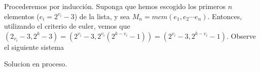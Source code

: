 \begin{sol}
	Procederemos por inducci\'on. Suponga que hemos escogido los primeros $n$ elementos ($e_{i} = 2 ^{v_{i}} - 3$) de la lista, y sea $M_{n} = mcm(e_{1}, e_{2} \cdots e_{n})$. Entonces, utilizando el criterio de euler, vemos que $(2_{v_{i}}-3, 2^{k}-3) = (2^{v_{i}}-3, 2^{v_{i}}(2^{k-v_{i}}-1)) = (2^{v_{i}}-3, 2^{k-v_{i}}-1)$. Observe el siguiente sistema
\end{sol}

\begin{sol}
	Solucion en proceso.
\end{sol}

